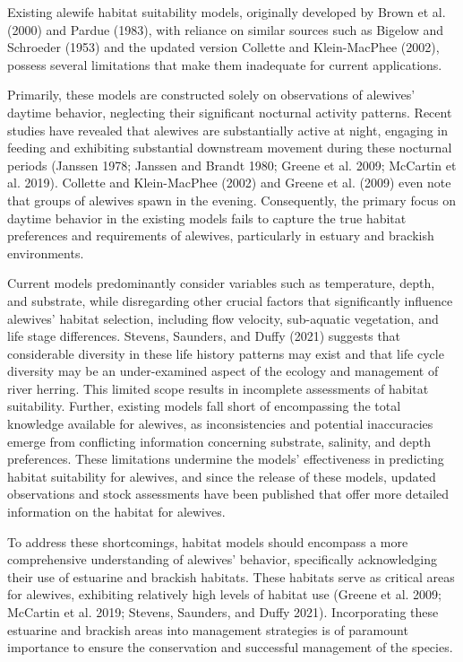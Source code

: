 \documentclass[
]{book}
\begin{document}
Existing alewife habitat suitability models, originally developed by Brown et al. (2000) and Pardue (1983), with reliance on similar sources such as Bigelow and Schroeder (1953) and the updated version Collette and Klein-MacPhee (2002), possess several limitations that make them inadequate for current applications.

Primarily, these models are constructed solely on observations of alewives' daytime behavior, neglecting their significant nocturnal activity patterns.
Recent studies have revealed that alewives are substantially active at night, engaging in feeding and exhibiting substantial downstream movement during these nocturnal periods (Janssen 1978; Janssen and Brandt 1980; Greene et al. 2009; McCartin et al. 2019).
Collette and Klein-MacPhee (2002) and Greene et al. (2009) even note that groups of alewives spawn in the evening. Consequently, the primary focus on daytime behavior in the existing models fails to capture the true habitat preferences and requirements of alewives, particularly in estuary and brackish environments.

Current models predominantly consider variables such as temperature, depth, and substrate, while disregarding other crucial factors that significantly influence alewives' habitat selection, including flow velocity, sub-aquatic vegetation, and life stage differences. Stevens, Saunders, and Duffy (2021) suggests that considerable diversity in these life history patterns may exist and that life cycle diversity may be an under-examined aspect of the ecology and management of river herring. This limited scope results in incomplete assessments of habitat suitability. Further, existing models fall short of encompassing the total knowledge available for alewives, as inconsistencies and potential inaccuracies emerge from conflicting information concerning substrate, salinity, and depth preferences. These limitations undermine the models' effectiveness in predicting habitat suitability for alewives, and since the release of these models, updated observations and stock assessments have been published that offer more detailed information on the habitat for alewives.

To address these shortcomings, habitat models should encompass a more comprehensive understanding of alewives' behavior, specifically acknowledging their use of estuarine and brackish habitats. These habitats serve as critical areas for alewives, exhibiting relatively high levels of habitat use (Greene et al. 2009; McCartin et al. 2019; Stevens, Saunders, and Duffy 2021). Incorporating these estuarine and brackish areas into management strategies is of paramount importance to ensure the conservation and successful management of the species.
\end{document}
